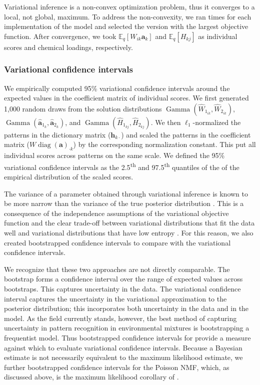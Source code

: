 Variational inference is a non-convex optimization problem, thus it converges to a local, not global, maximum. To address the non-convexity, we ran  times for each implementation of the model and selected the version with the largest objective function. After convergence, we took $\mathbb{E}_{q}\left[W_{i k}\mathbf{a}_{k}\right]$ and $\mathbb{E}_{q}\left[H_{k j}\right]$ as individual scores and chemical loadings, respectively.

\subsubsection{Variational confidence intervals}
\label{methods_vci}
We empirically computed 95\% variational confidence intervals around the expected values in the coefficient matrix of individual scores. We first generated 1,000 random draws from the solution distributions $\operatorname{Gamma}(\hat{W}_{1_{i k}}, \hat{W}_{2_{i k}})$, $\operatorname{Gamma}(\hat{\mathbf{a}}_{1_k}, \hat{\mathbf{a}}_{2_k})$, and $\operatorname{Gamma}(\hat{H}_{1_{k j}}, \hat{H}_{2_{k j}})$. We then $\ell_1$-normalized the patterns in the dictionary matrix ($\mathbf{h}_{k \cdot}$) and scaled the patterns in the coefficient matrix ($W\operatorname{diag}(\mathbf{a})_{\cdot k}$) by the corresponding normalization constant. This put all individual scores across patterns on the same scale. We defined the 95\% variational confidence intervals as the 2.5\textsuperscript{th} and 97.5\textsuperscript{th} quantiles of the of the empirical distribution of the scaled scores.

The variance of a parameter obtained through variational inference is known to be more narrow than the variance of the true posterior distribution \citep{svensen2005robust}. This is a consequence of the independence assumptions of the variational objective function and the clear trade-off between variational distributions that fit the data well and variational distributions that have low entropy \citep{blei2017variational}. For this reason, we also created bootstrapped confidence intervals to compare with the variational confidence intervals. 

We recognize that these two approaches are not directly comparable. The bootstrap forms a confidence interval over the range of expected values across bootstraps. This captures uncertainty in the data. The variational confidence interval captures the uncertainty in the variational approximation to the posterior distribution; this incorporates both uncertainty in the data and in the model. As the field currently stands, however, the best method of capturing uncertainty in pattern recognition in environmental mixtures is bootstrapping a frequentist model. Thus bootstrapped confidence intervals for \bnmf provide a measure against which to evaluate variational confidence intervals. Because a Bayesian estimate is not necessarily equivalent to the maximum likelihood estimate, we further bootstrapped confidence intervals for the Poisson NMF, which, as discussed above, is the maximum likelihood corollary of \bnmfc.

